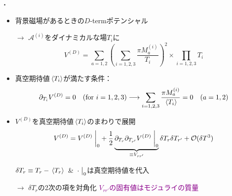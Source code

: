 \documentclass[
  a4paper,uplatex,dvipdfmx,9pt,
  xcolor = {dvipsnames,svgnames},
  hyperref ={colorlinks=true,citecolor=Navy,linkcolor=NavyBlue,urlcolor=purple}
]{beamer}
\begin{document}
\begin{frame}
  \frametitle{\thesection.\thesubsection\ \subsecname}

  \begin{itemize}
    \item 
    背景磁場があるときの$D$-termポテンシャル

    \hspace*{3cm}
    $\rightarrow$
    $\mathcal{A}^{(i)}$をダイナミカルな場$T_{i}$に
    \begin{equation}
      V^{(D)}
      =
      \sum_{a=1,2}
      \left(  
        \sum_{i=1,2,3}
        \frac{\pi M_{a}^{(i)}}{T_{i}}
      \right)^2
      \times
      \prod_{i=1,2,3}T_{i}
      \nonumber
    \end{equation}
    \item 
    真空期待値$\ev*{T_{i}}$が満たす条件：
    \begin{equation}
      \partial_{T_{i}}V^{(D)}=0
      \quad
      (\text{for}\ i=1,2,3)
      \longrightarrow
      \sum_{i=1,2,3}
      \frac{\pi M_{a}^{(i)}}{\ev*{T_{i}}}
      =
      0
      \quad
      (a=1,2)
      \label{SUSY_cond}
      \nonumber
    \end{equation}

    \item 
    $V^{(D)}$を真空期待値$\ev*{T_{i}}$のまわりで展開
    \begin{equation}
      V^{(D)}
      =
      V^{(D)}
      \left.\vphantom{\frac{1}{2}}\right|_{0}
      +
      \frac{1}{2}
      \underbrace{
        \partial_{T_{r}}\partial_{T_{r'}}V^{(D)}
        \left.\vphantom{\frac{1}{2}}\right|_{0}
      }_{\equiv V_{rr'}}
      \delta T_{r}\delta T_{r'}
      +
      \mathcal{O}(\delta T^3)
      \nonumber
    \end{equation}
    \begin{center}
      $\delta T_{r}\equiv T_{r}-\ev*{T_{r}}$\ \&\ $\cdot\left.\vphantom{\frac{1}{2}}\right|_{0}$は真空期待値を代入
    \end{center}

    \vspace{5pt}

    $\longrightarrow$ $\delta T_{r}$の2次の項を対角化
    \qquad
    \textcolor{DarkMagenta}{$V_{rr'}$の固有値はモジュライの質量}
  \end{itemize}

\end{frame}
\end{document}
